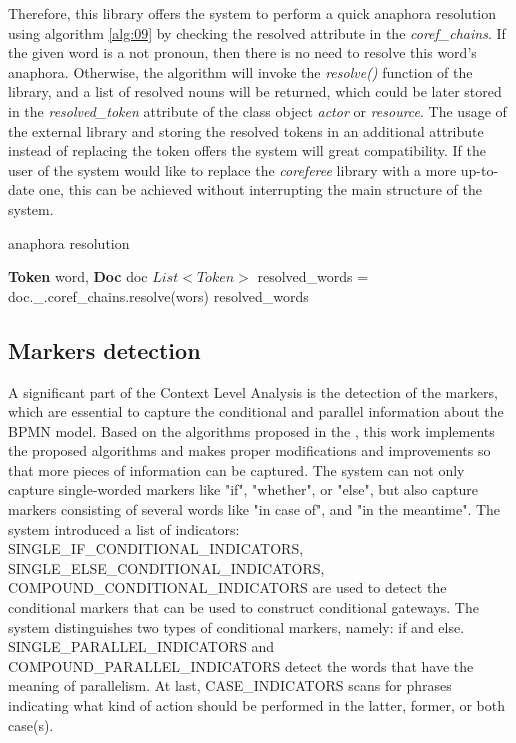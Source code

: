 Therefore, this library offers the system to perform a quick anaphora resolution using algorithm \ref{alg:09} by checking the resolved attribute in the \textit{coref\_chains}. If the given word is a not pronoun, then there is no need to resolve this word's anaphora. Otherwise, the algorithm will invoke the \textit{resolve()} function of the library, and a list of resolved nouns will be returned, which could be later stored in the \textit{resolved\_token} attribute of the class object \textit{actor} or \textit{resource}. The usage of the external library and storing the resolved tokens in an additional attribute instead of replacing the token offers the system will great compatibility. If the user of the system would like to replace the \textit{coreferee} library with a more up-to-date one, this can be achieved without interrupting the main structure of the system.

\begin{algorithm}
\caption{anaphora resolution}
\label{alg:09}
	\begin{algorithmic} [1]
		\REQUIRE \textbf{Token} word, \textbf{Doc} doc
		\RETURN []
		\ELSE
		\STATE $List<Token>$ resolved\_words = doc.\_.coref\_chains.resolve(wors)
		\RETURN resolved\_words
		\ENDIF
	\end{algorithmic}
\end{algorithm}

\subsection{Markers detection}
A significant part of the Context Level Analysis is the detection of the markers, which are essential to capture the conditional and parallel information about the BPMN model. Based on the algorithms proposed in the \cite{t2m_1_main}, this work implements the proposed algorithms and makes proper modifications and improvements so that more pieces of information can be captured. The system can not only capture single-worded markers like "if", "whether", or "else", but also capture markers consisting of several words like "in case of", and "in the meantime". The system introduced a list of indicators:  SINGLE\_IF\_CONDITIONAL\_INDICATORS, SINGLE\_ELSE\_CONDITIONAL\_INDICATORS, COMPOUND\_CONDITIONAL\_INDICATORS are used to detect the conditional markers that can be used to construct conditional gateways. The system distinguishes two types of conditional markers, namely: if and else. SINGLE\_PARALLEL\_INDICATORS and COMPOUND\_PARALLEL\_INDICATORS detect the words that have the meaning of parallelism. At last, CASE\_INDICATORS scans for phrases indicating what kind of action should be performed in the latter, former, or both case(s).

